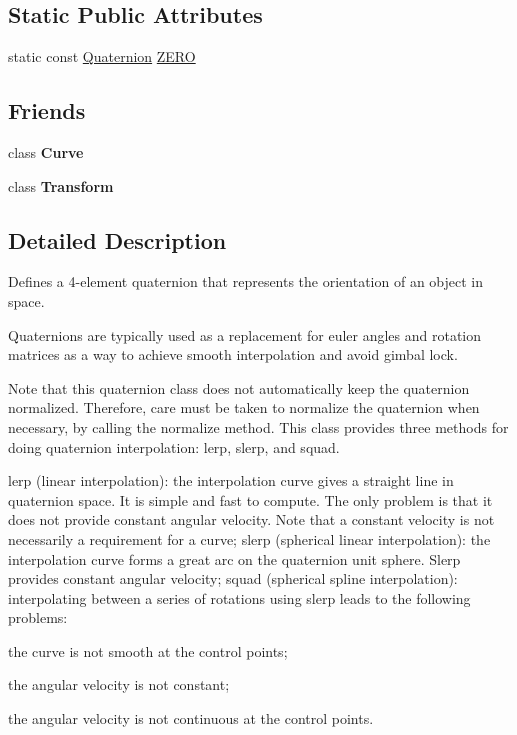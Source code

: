 \subsection*{Static Public Attributes}
\begin{DoxyCompactItemize}
\item 
static const \hyperlink{classQuaternion}{Quaternion} \hyperlink{classQuaternion_a808de84686edca53817636945082be8b}{Z\+E\+RO}
\end{DoxyCompactItemize}
\subsection*{Friends}
\begin{DoxyCompactItemize}
\item 
\mbox{\label{classQuaternion_a5542afcc22b4bab7679270a1de8ff818}} 
class {\bfseries Curve}
\item 
\mbox{\label{classQuaternion_aa1cc1190aa1b958d686d46e0860bc836}} 
class {\bfseries Transform}
\end{DoxyCompactItemize}


\subsection{Detailed Description}
Defines a 4-\/element quaternion that represents the orientation of an object in space.

Quaternions are typically used as a replacement for euler angles and rotation matrices as a way to achieve smooth interpolation and avoid gimbal lock.

Note that this quaternion class does not automatically keep the quaternion normalized. Therefore, care must be taken to normalize the quaternion when necessary, by calling the normalize method. This class provides three methods for doing quaternion interpolation\+: lerp, slerp, and squad.

lerp (linear interpolation)\+: the interpolation curve gives a straight line in quaternion space. It is simple and fast to compute. The only problem is that it does not provide constant angular velocity. Note that a constant velocity is not necessarily a requirement for a curve; slerp (spherical linear interpolation)\+: the interpolation curve forms a great arc on the quaternion unit sphere. Slerp provides constant angular velocity; squad (spherical spline interpolation)\+: interpolating between a series of rotations using slerp leads to the following problems\+:
\begin{DoxyItemize}
\item the curve is not smooth at the control points;
\item the angular velocity is not constant;
\item the angular velocity is not continuous at the control points.
\end{DoxyItemize}

